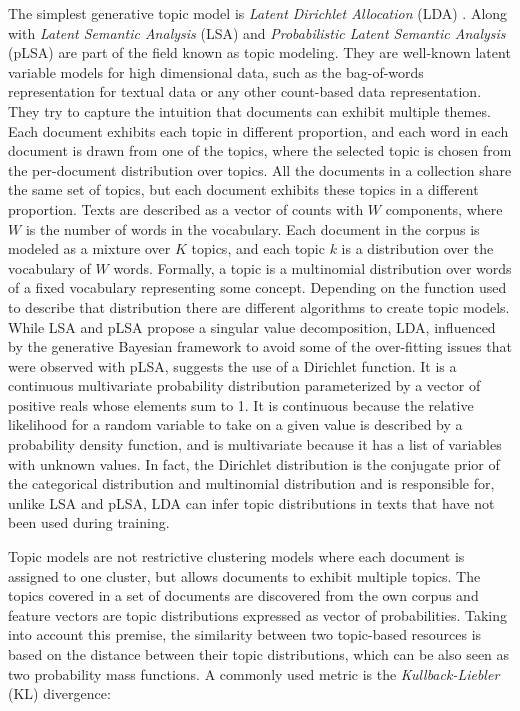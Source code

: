 The simplest generative topic model is \textit{Latent Dirichlet Allocation} (LDA) \citep{Blei2003}. Along with \textit{Latent Semantic Analysis} (LSA) \citep{Deerwester1990} and \textit{Probabilistic Latent Semantic Analysis} (pLSA) \citep{Hofmann2001} are part of the field known as topic modeling. They are well-known latent variable models for high dimensional data, such as the bag-of-words representation for textual data or any other count-based data representation. They try to capture the intuition that documents can exhibit multiple themes. Each document exhibits each topic in different proportion, and each word in each document is drawn from one of the topics, where the selected topic is chosen from the per-document distribution over topics. All the documents in a collection share the same set of topics, but each document exhibits these topics in a different proportion. Texts are described as a vector of counts with $W$ components, where $W$ is the number of words in the vocabulary. Each document in the corpus is modeled as a mixture over $K$ topics, and each topic $k$ is a distribution over the vocabulary of $W$ words. Formally, a topic is a multinomial distribution over words of a fixed vocabulary representing some concept. Depending on the function used to describe that distribution there are different algorithms to create topic models. While LSA and pLSA propose a singular value decomposition, LDA, influenced by the generative Bayesian framework to avoid some of the over-fitting issues that were observed with pLSA, suggests the use of a Dirichlet function. It is a continuous multivariate probability distribution parameterized by a vector of positive reals whose elements sum to 1.  It is continuous because the relative likelihood for a random variable to take on a given value is described by a probability density function, and is multivariate because it has a list of variables with unknown values. In fact, the Dirichlet distribution is the conjugate prior of the categorical distribution and multinomial distribution and is responsible for, unlike LSA and pLSA, LDA can infer topic distributions in texts that have not been used during training.

Topic models are not restrictive clustering models where each document is assigned to one cluster, but allows documents to exhibit multiple topics. The topics covered in a set of documents are discovered from the own corpus and feature vectors are topic distributions expressed as vector of probabilities. Taking into account this premise, the similarity between two topic-based resources is based on the distance between their topic distributions, which can be also seen as two probability mass functions. A commonly used metric is the \textit{Kullback-Liebler} (KL) divergence:

